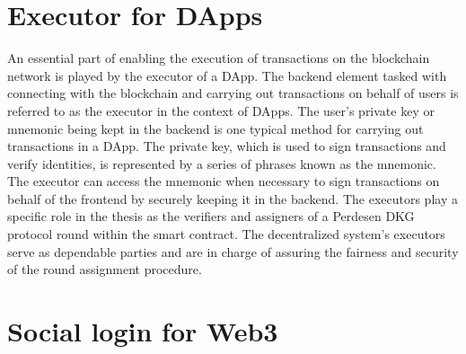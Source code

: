 \documentclass[../Main.tex]{subfiles}
\begin{document}
\section{Executor for DApps}
An essential part of enabling the execution of transactions on the blockchain network is played by the executor of a DApp. The backend element tasked with connecting with the blockchain and carrying out transactions on behalf of users is referred to as the executor in the context of DApps. The user's private key or mnemonic being kept in the backend is one typical method for carrying out transactions in a DApp. The private key, which is used to sign transactions and verify identities, is represented by a series of phrases known as the mnemonic. The executor can access the mnemonic when necessary to sign transactions on behalf of the frontend by securely keeping it in the backend. The executors play a specific role in the thesis as the verifiers and assigners of a Perdesen DKG protocol round within the smart contract. The decentralized system's executors serve as dependable parties and are in charge of assuring the fairness and security of the round assignment procedure.

\section{Social login for Web3}
\end{document}
